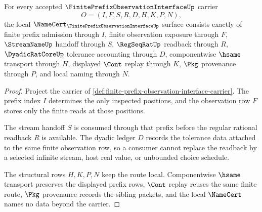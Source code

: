 \begin{theorem}
\label{thm:finite-prefix-observation-interface-namecert-obligations}
For every accepted $\FinitePrefixObservationInterfaceUp$ carrier
$$
O=(I,F,S,R,D,H,K,P,N),
$$
the local $\NameCert_{\FinitePrefixObservationInterfaceUp}$ surface consists exactly of finite prefix admission through $I$, finite observation exposure through $F$, $\StreamNameUp$ handoff through $S$, $\RegSeqRatUp$ readback through $R$, $\DyadicRatCoreUp$ tolerance accounting through $D$, componentwise $\hsame$ transport through $H$, displayed $\Cont$ replay through $K$, $\Pkg$ provenance through $P$, and local naming through $N$.
\end{theorem}
\begin{proof}
Project the carrier of \autoref{def:finite-prefix-observation-interface-carrier}. The prefix index $I$ determines the only inspected positions, and the observation row $F$ stores only the finite reads at those positions.

The stream handoff $S$ is consumed through that prefix before the regular rational readback $R$ is available. The dyadic ledger $D$ records the tolerance data attached to the same finite observation row, so a consumer cannot replace the readback by a selected infinite stream, host real value, or unbounded choice schedule.

The structural rows $H,K,P,N$ keep the route local. Componentwise $\hsame$ transport preserves the displayed prefix rows, $\Cont$ replay reuses the same finite route, $\Pkg$ provenance records the sibling packets, and the local $\NameCert$ names no data beyond the carrier.
\end{proof}

